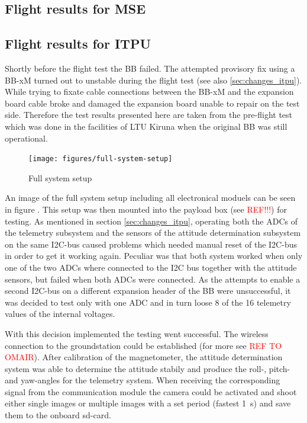 \subsection{Flight results for MSE}
%

\subsection{Flight results for ITPU}
%
Shortly before the flight test the BB failed. The attempted provisory fix using a BB-xM turned out to unstable during the flight test (see also \ref{sec:changes_itpu}). While trying to fixate cable connections between the BB-xM and the expansion board cable broke and damaged the expansion board unable to repair on the test side. Therefore the test results presented here are taken from the pre-flight test which was done in the facilities of LTU Kiruna when the original BB was still operational.

\begin{figure}
\centering
\texttt{[image: figures/full-system-setup]}
\caption{Full system setup}
\label{fig:FlightTest1_1}
\end{figure}

An image of the full system setup including all electronical moduels can be seen in figure . This setup was then mounted into the payload box (see \textcolor{red}{REF!!!}) for testing. As mentioned in section \ref{sec:changes_itpu}, operating both the ADCs of the telemetry subsystem and the sensors of the attitude determination subsystem on the same I2C-bus caused problems which needed manual reset of the I2C-bus in order to get it working again. Peculiar was that both system worked when only one of the two ADCs where connected to the I2C bus together with the attitude sensors, but failed when both ADCs were connected. As the attempts to enable a second I2C-bus on a different expansion header of the BB were unsuccessful, it was decided to test only with one ADC and in turn loose 8 of the 16 telemetry values of the internal voltages. 

With this decision implemented the testing went successful. The wireless connection to the groundstation could be established (for more see \textcolor{red}{REF TO OMAIR}). After calibration of the magnetometer, the attitude determination system was able to determine the attitude stabily and produce the roll-, pitch- and yaw-angles for the telemetry system. When receiving the corresponding signal from the communication module the camera could be activated and shoot either single images or multiple images with a set period (fastest 1~s) and save them to the onboard sd-card.  


